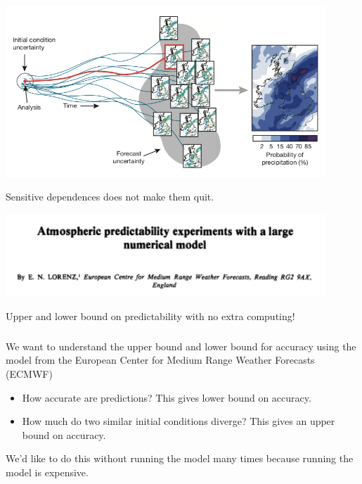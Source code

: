 \documentclass[aspectratio=169]{beamer}
\begin{document}
\begin{frame}
\frametitle{}

\begin{center}
\includegraphics[width = 0.9\textwidth]{figures/bauer_quiet_2015_fig3}
\end{center}

\vfill
Sensitive dependences does not make them quit.

\end{frame}
\begin{frame}

\begin{center}
\includegraphics[width = 0.9\textwidth]{figures/lorenz_atmospheric_1982_title}
\end{center}

\vfill
Upper and lower bound on predictability with no extra computing!  

\end{frame}
\begin{frame}
\frametitle{}

We want to understand the upper bound and lower bound for accuracy using the model from the European Center for Medium Range Weather Forecasts (ECMWF) 
\begin{itemize}
\item How accurate are predictions?  This gives lower bound on accuracy.
\pause
\item How much do two similar initial conditions diverge?  This gives an upper bound on accuracy.
\end{itemize}


We'd like to do this without running the model many times because running the model is expensive.

\end{frame}
\end{document}

